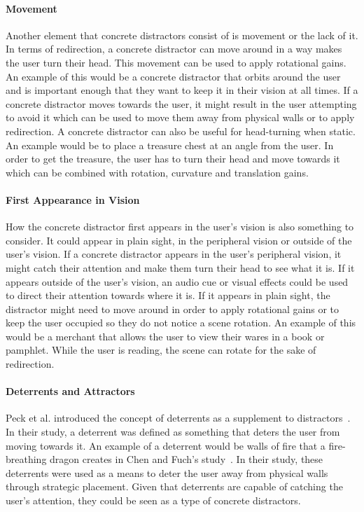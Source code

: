 \paragraph{Movement}
Another element that concrete distractors consist of is movement or the lack of it. In terms of redirection, a concrete distractor can move around in a way makes the user turn their head. This movement can be used to apply rotational gains. An example of this would be a concrete distractor that orbits around the user and is important enough that they want to keep it in their vision at all times. If a concrete distractor moves towards the user, it might result in the user attempting to avoid it which can be used to move them away from physical walls or to apply redirection. A concrete distractor can also be useful for head-turning when static. An example would be to place a treasure chest at an angle from the user. In order to get the treasure, the user has to turn their head and move towards it which can be combined with rotation, curvature and translation gains.

\paragraph{First Appearance in Vision}
How the concrete distractor first appears in the user's vision is also something to consider. It could appear in plain sight, in the peripheral vision or outside of the user's vision. If a concrete distractor appears in the user's peripheral vision, it might catch their attention and make them turn their head to see what it is. If it appears outside of the user's vision, an audio cue or visual effects could be used to direct their attention towards where it is. If it appears in plain sight, the distractor might need to move around in order to apply rotational gains or to keep the user occupied so they do not notice a scene rotation. An example of this would be a merchant that allows the user to view their wares in a book or pamphlet. While the user is reading, the scene can rotate for the sake of redirection. 
         
\paragraph{Deterrents and Attractors}
Peck et al. introduced the concept of deterrents as a supplement to distractors~\cite{peck2011evaluation}. In their study, a deterrent was defined as something that deters the user from moving towards it. An example of a deterrent would be walls of fire that a fire-breathing dragon creates in Chen and Fuch's study~\cite{chen2017supporting}. In their study, these deterrents were used as a means to deter the user away from physical walls through strategic placement. Given that deterrents are capable of catching the user's attention, they could be seen as a type of concrete distractors. 


